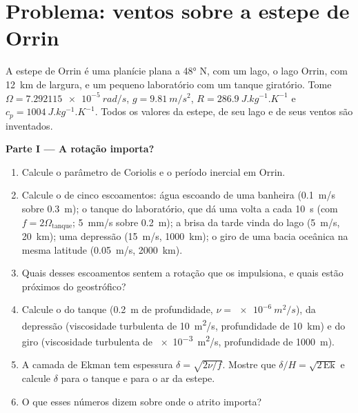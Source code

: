 \section{Problema: ventos sobre a estepe de Orrin}

\begin{problem}
\label{pb:b3:gfd-foundations:1}
A estepe de Orrin é uma planície plana a \ang{48} N, com um lago, o lago Orrin,
com \qty{12}{km} de largura, e um pequeno laboratório com um tanque giratório. Tome
$\Omega = \qty{7.292115e-5}{rad/s}$, $g = \qty{9.81}{m/s^2}$, $R =
\qty{286.9}{J.kg^{-1}.K^{-1}}$ e $c_p = \qty{1004}{J.kg^{-1}.K^{-1}}$.
Todos os valores da estepe, de seu lago e de seus ventos são inventados.

\medskip\noindent\textbf{Parte I --- A rotação importa?}
\begin{enumerate}
\item Calcule o parâmetro de Coriolis e o período inercial em Orrin.
\item Calcule o  de cinco escoamentos: água escoando de uma banheira
  (\qty{0.1}{m/s} sobre \qty{0.3}{m}); o tanque do laboratório, que dá uma volta
  a cada \qty{10}{s} (com $f = 2\Omega_{\text{tanque}}$; \qty{5}{mm/s}
  sobre \qty{0.2}{m}); a brisa da tarde vinda do lago (\qty{5}{m/s},
  \qty{20}{km}); uma depressão (\qty{15}{m/s}, \qty{1000}{km}); o giro de uma
  bacia oceânica na mesma latitude (\qty{0.05}{m/s}, \qty{2000}{km}).
\item Quais desses escoamentos sentem a rotação que os impulsiona, e quais estão
  próximos do geostrófico?
\item Calcule o  do tanque (\qty{0.2}{m} de profundidade, $\nu =
  \qty{e-6}{m^2/s}$), da depressão (viscosidade turbulenta de \qty{10}{m^2/s},
  profundidade de \qty{10}{km}) e do giro (viscosidade turbulenta de \qty{e-3}{m^2/s},
  profundidade de \qty{1000}{m}).
\item A camada de Ekman tem espessura $\delta = \sqrt{2\nu/f}$. Mostre que
  $\delta/H = \sqrt{2\,\mathrm{Ek}}$ e calcule $\delta$ para o tanque e para
  o ar da estepe.
\item O que esses números dizem sobre onde o atrito importa?
\end{enumerate}


\end{problem}
